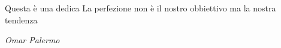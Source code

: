 \cleardoublepage
    \thispagestyle{empty}
            \begin{flushright}
				Questa è una dedica
				\vspace{1em}
				La perfezione non è il nostro obbiettivo
				ma la nostra tendenza

				\textit{Omar Palermo}

            \end{flushright}
\cleardoublepage
